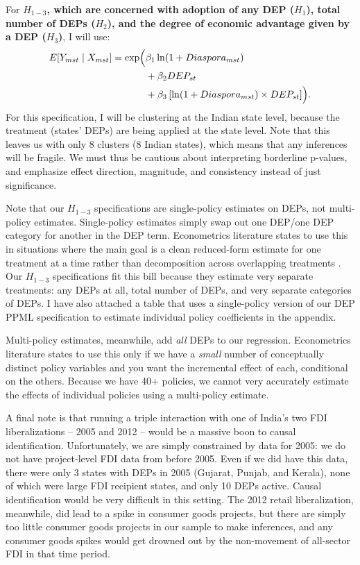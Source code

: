 \documentclass[doublespace,nopageskip]{UVAthesis}
\begin{document}
For \textbf{$H_{1-3}$, which are concerned with adoption of any DEP ($H_1$), total number of DEPs ($H_2$), and the degree of economic advantage given by a DEP ($H_3$)}, I will use:
\[
\begin{aligned}
E[Y_{mst} \mid X_{mst}] =
\exp \Bigl(
&\beta_1 \ln(1+Diaspora_{mst}) \\
&+ \beta_2 DEP_{st} \\
&+ \beta_3 \left[\ln(1+Diaspora_{mst}) \times DEP_{st}\right] \Bigr).
\end{aligned}
\]
For this specification, I will be clustering at the Indian state level, because the treatment (states' DEPs) are being applied at the state level. Note that this leaves us with only 8 clusters (8 Indian states), which means that any inferences will be fragile. We must thus be cautious about interpreting borderline p-values, and emphasize effect direction, magnitude, and consistency instead of just significance.

Note that our $H_{1-3}$ specifications are single-policy estimates on DEPs, not multi-policy estimates. Single-policy estimates simply swap out one DEP/one DEP category for another in the DEP term. Econometrics literature states to use this in situations where the main goal is a clean reduced-form estimate for one treatment at a time rather than decomposition across overlapping treatments \citep{goldsmith-pinkham_estimating_2021}. Our $H_{1-3}$ specifications fit this bill because they estimate very separate treatments: any DEPs at all, total number of DEPs, and very separate categories of DEPs. I have also attached a table that uses a single-policy version of our DEP PPML specification to estimate individual policy coefficients in the appendix.

Multi-policy estimates, meanwhile, add \textit{all} DEPs to our regression. Econometrics literature states to use this only if we have a \textit{small} number of conceptually distinct policy variables and you want the incremental effect of each, conditional on the others\citep{yotov_advanced_nodate}. Because we have 40+ policies, we cannot very accurately estimate the effects of individual policies using a multi-policy estimate. 

A final note is that running a triple interaction with one of India's two FDI liberalizations -- 2005 and 2012 -- would be a massive boon to causal identification. Unfortunately, we are simply constrained by data for 2005: we do not have project-level FDI data from before 2005. Even if we did have this data, there were only 3 states with DEPs in 2005 (Gujarat, Punjab, and Kerala), none of which were large FDI recipient states, and only 10 DEPs active. Causal identification would be very difficult in this setting. The 2012 retail liberalization, meanwhile, did lead to a spike in consumer goods projects, but there are simply too little consumer goods projects in our sample to make inferences, and any consumer goods spikes would get drowned out by the non-movement of all-sector FDI in that time period.
\end{document}
